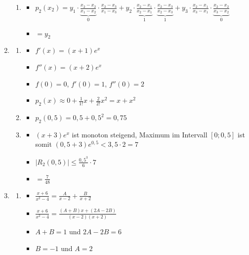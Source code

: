 \documentclass[12pt]{article}
\begin{document}
\begin{enumerate}
\begin{enumerate}
\item
\begin{itemize}
\item $p_2(x_2) =
y_1\cdot\underbrace{\frac{x_2-x_2}{x_1-x_2}}_0\cdot\frac{x_2-x_3}{x_1-x_3} +
y_2\cdot\underbrace{\frac{x_2-x_1}{x_2-x_1}}_1\cdot\underbrace{\frac{x_2-x_3}{x_2-x_3}}_1 +
y_3\cdot\frac{x_2-x_1}{x_3-x_1}\cdot\underbrace{\frac{x_2-x_2}{x_3-x_2}}_0$
\item $=y_2$
\end{itemize}

\end{enumerate}


\item
\begin{enumerate}

\item
\begin{itemize}
\item $f'(x) = (x+1)e^x$
\item $f''(x) = (x+2)e^x$
\item $f(0) = 0$, $f'(0) = 1$, $f''(0)=2$
\item $p_2(x) \approx 0 + \frac{1}{1!} x + \frac{2}{2!} x^2 = x+x^2$
\end{itemize}

\item
\begin{itemize}
\item $p_2(0{,}5) = 0{,}5+0{,}5^2 = 0{,}75$
\end{itemize}

\item
\begin{itemize}
\item $(x+3)e^x$ ist monoton steigend, Maximum im Intervall $[0;0{,}5]$ ist somit $(0{,}5+3)e^{0{,}5} < 3{,}5\cdot 2 = 7$
\item $|R_2(0{,}5)| \le \frac{0{,}5^3}{6}\cdot 7$
\item $=\frac{7}{48}$
\end{itemize}

\end{enumerate}


\newpage

\item 
\begin{enumerate}

\item
\begin{itemize}
\item $\frac{x+6}{x^2-4} = \frac{A}{x-2}+\frac{B}{x+2}$
\item $\frac{x+6}{x^2-4} = \frac{(A+B)x+(2A-2B)}{(x-2)(x+2)}$
\item $A+B=1$ und $2A-2B=6$
\item $B=-1$ und $A=2$
\end{itemize}


\end{enumerate}
\end{enumerate}
\end{document}
